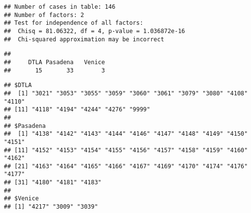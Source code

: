 \documentclass[]{article}
\newenvironment{Shaded}{\begin{snugshade}}{\end{snugshade}}
\newcommand{\KeywordTok}[1]{\textcolor[rgb]{0.13,0.29,0.53}{\textbf{#1}}}
\newcommand{\StringTok}[1]{\textcolor[rgb]{0.31,0.60,0.02}{#1}}
\newcommand{\CommentTok}[1]{\textcolor[rgb]{0.56,0.35,0.01}{\textit{#1}}}
\newcommand{\ControlFlowTok}[1]{\textcolor[rgb]{0.13,0.29,0.53}{\textbf{#1}}}
\newcommand{\OperatorTok}[1]{\textcolor[rgb]{0.81,0.36,0.00}{\textbf{#1}}}
\newcommand{\NormalTok}[1]{#1}
\begin{document}
\begin{verbatim}
## Number of cases in table: 146 
## Number of factors: 2 
## Test for independence of all factors:
##  Chisq = 81.06322, df = 4, p-value = 1.036872e-16
##  Chi-squared approximation may be incorrect
\end{verbatim}

\begin{Shaded}
\end{Shaded}

\begin{verbatim}
## 
##     DTLA Pasadena   Venice 
##       15       33        3
\end{verbatim}

\begin{Shaded}
\end{Shaded}

\begin{verbatim}
## $DTLA
##  [1] "3021" "3053" "3055" "3059" "3060" "3061" "3079" "3080" "4108" "4110"
## [11] "4118" "4194" "4244" "4276" "9999"
## 
## $Pasadena
##  [1] "4138" "4142" "4143" "4144" "4146" "4147" "4148" "4149" "4150" "4151"
## [11] "4152" "4153" "4154" "4155" "4156" "4157" "4158" "4159" "4160" "4162"
## [21] "4163" "4164" "4165" "4166" "4167" "4169" "4170" "4174" "4176" "4177"
## [31] "4180" "4181" "4183"
## 
## $Venice
## [1] "4217" "3009" "3039"
\end{verbatim}

\begin{Shaded}
\end{Shaded}
\end{document}
